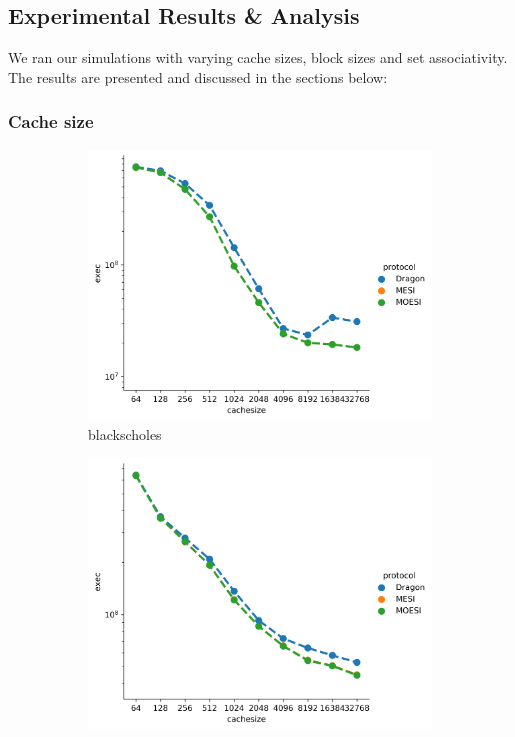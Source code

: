 \documentclass[nonacm,acmsmall,screen,11pt]{acmart}
\begin{document}
\subsection{Experimental Results \& Analysis}
We ran our simulations with varying cache sizes, block sizes and set associativity. The results are presented and discussed in the sections below:
\subsubsection{Cache size}
\begin{figure}[htb!]
  \centering
  \begin{subfigure}{0.32\textwidth}
    \includegraphics[width=\textwidth]{cachesize-blackscholes}
    \caption{blackscholes}
  \end{subfigure}
  \begin{subfigure}{0.32\textwidth}
    \includegraphics[width=\columnwidth]{cachesize-bodytrack}

\end{subfigure}
\end{figure}
\end{document}
